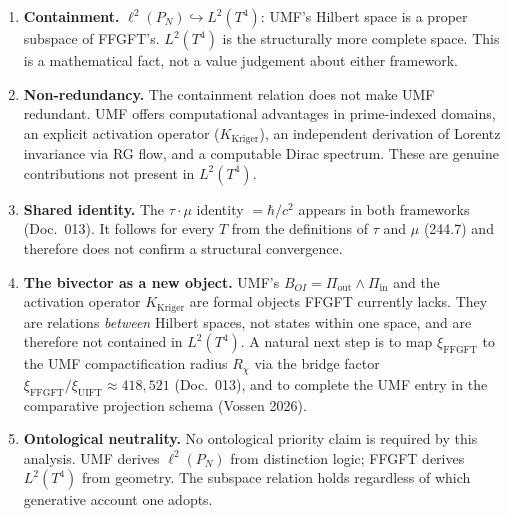 \begin{enumerate}

  \item \textbf{Containment.}
    $\ell^2(P_N) \hookrightarrow L^2(T^4)$: UMF's Hilbert space is a proper
    subspace of FFGFT's. $L^2(T^4)$ is the structurally more complete space.
    This is a mathematical fact, not a value judgement about either framework.

  \item \textbf{Non-redundancy.}
    The containment relation does not make UMF redundant. UMF offers
    computational advantages in prime-indexed domains, an explicit activation
    operator ($K_\text{Kriger}$), an independent derivation of Lorentz
    invariance via RG flow, and a computable Dirac spectrum. These are genuine
    contributions not present in $L^2(T^4)$.

  \item \textbf{Shared identity.}
    The \texorpdfstring{$\tau\cdot\mu$}{tau.mu} identity $= \hbar/c^2$
    appears in both frameworks (Doc.~013). It follows for every $T$ from the
    definitions of $\tau$ and $\mu$ (244.7) and therefore does not confirm a
    structural convergence.

  \item \textbf{The bivector as a new object.}
    UMF's $B_{OI} = \Pi_\text{out} \wedge \Pi_\text{in}$ and the activation
    operator $K_\text{Kriger}$ are formal objects FFGFT currently lacks.
    They are relations \emph{between} Hilbert spaces, not states within one
    space, and are therefore not contained in $L^2(T^4)$. A natural next step
    is to map $\xi_\text{FFGFT}$ to the UMF compactification radius $R_\chi$
    via the bridge factor $\xi_\text{FFGFT}/\xi_\text{UIFT} \approx 418{,}521$
    (Doc.~013), and to complete the UMF entry in the comparative projection
    schema (Vossen 2026).

  \item \textbf{Ontological neutrality.}
    No ontological priority claim is required by this analysis. UMF derives
    $\ell^2(P_N)$ from distinction logic; FFGFT derives $L^2(T^4)$ from
    geometry. The subspace relation holds regardless of which generative
    account one adopts.

\end{enumerate}
